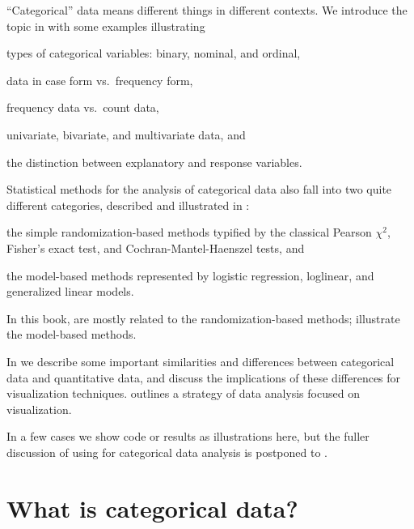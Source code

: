\documentclass[11pt]{book}\usepackage[]{graphicx}\usepackage[]{color}
\begin{document}
``Categorical'' data means different things in different
contexts.  We introduce the topic in 
with some examples illustrating
\begin{seriate}
\item types of categorical variables: binary, nominal, and ordinal,
\item data in case form vs.\ frequency form,
\item frequency data vs.\ count data,
\item univariate, bivariate, and multivariate data, and
\item the distinction between explanatory and response variables.
\end{seriate}

Statistical methods for the analysis of categorical data also fall into two
quite different categories, described and illustrated in : 
\begin{seriate}
\item the simple randomization-based
methods typified by
the classical Pearson $\chi^2$, Fisher's exact test, and Cochran-Mantel-Haenszel
tests, and 
\item the model-based methods represented by
logistic regression, loglinear, and generalized linear models.
\end{seriate}
In this book, 
are mostly related to the randomization-based methods; 
illustrate the model-based methods.

In  we describe some important similarities
and 
differences between categorical data and
quantitative data, and discuss the implications of these differences for
visualization techniques.
 outlines a strategy of data analysis
focused on visualization.

In a few cases we show \R code or results as illustrations here,
but the fuller discussion of using \R for categorical data
analysis is postponed to .


\section{What is categorical data?}\label{sec:whatis}
\end{document}

